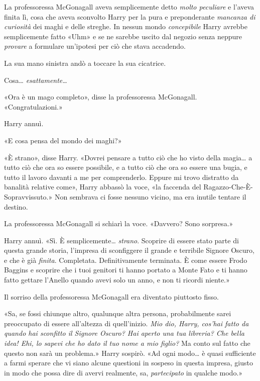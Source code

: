 La professoressa McGonagall aveva semplicemente detto \textit{molto peculiare} e l’aveva finita lì, cosa che aveva sconvolto Harry per la pura e preponderante \textit{mancanza di curiosità} dei maghi e delle streghe. In nessun mondo \textit{concepibile} Harry avrebbe semplicemente fatto «Uhm» e se ne sarebbe uscito dal negozio senza neppure \textit{provare} a formulare un’ipotesi per ciò che stava accadendo.

La sua mano sinistra andò a toccare la sua cicatrice.

Cosa… \textit{esattamente…}

«Ora è un mago completo», disse la professoressa McGonagall. «Congratulazioni.»

Harry annuì.

«E cosa pensa del mondo dei maghi?»

«È strano», disse Harry. «Dovrei pensare a tutto ciò che ho visto della magia… a tutto ciò che ora so essere possibile, e a tutto ciò che ora so essere una bugia, e tutto il lavoro davanti a me per comprenderlo. Eppure mi trovo distratto da banalità relative come», Harry abbassò la voce, «la faccenda del Ragazzo-Che-È-Sopravvissuto.» Non sembrava ci fosse nessuno vicino, ma era inutile tentare il destino.

La professoressa McGonagall si schiarì la voce. «Davvero? Sono sorpresa.»

Harry annuì. «Sì. È semplicemente… \textit{strano}. Scoprire di essere stato parte di questa grande storia, l’impresa di sconfiggere il grande e terribile Signore Oscuro, e che è già \textit{finita}. Completata. Definitivamente terminata. È come essere Frodo Baggins e scoprire che i tuoi genitori ti hanno portato a Monte Fato e ti hanno fatto gettare l’Anello quando avevi solo un anno, e non ti ricordi niente.»

Il sorriso della professoressa McGonagall era diventato piuttosto fisso.

«Sa, se fossi chiunque altro, qualunque altra persona, probabilmente sarei preoccupato di essere all’altezza di quell’inizio. \textit{Mio dio, Harry, cos’hai fatto da quando hai sconfitto il Signore Oscuro? Hai aperto una tua libreria? Che bella idea! Ehi, lo sapevi che ho dato il tuo nome a mio figlio?} Ma conto sul fatto che questo non sarà un problema.» Harry sospirò. «Ad ogni modo… è quasi sufficiente a farmi sperare che vi siano alcune questioni in sospeso in questa impresa, giusto in modo che possa dire di avervi realmente, sa, \textit{partecipato} in qualche modo.»

